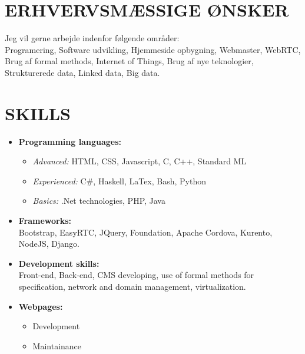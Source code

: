 \documentclass[11pt,a4paper,sans]{moderncv}        %
\begin{document}
\section{ERHVERVSMÆSSIGE ØNSKER}
Jeg vil gerne arbejde indenfor følgende områder:\\
Programering, Software udvikling, Hjemmeside opbygning, Webmaster, WebRTC, Brug af formal methods, Internet of Things, Brug af nye teknologier, Strukturerede data, Linked data, Big data.
\fi

\ifenglish
\section{SKILLS}
\begin{itemize}
\item \textbf{Programming languages:}
\begin{itemize}
\item \textit{Advanced:} HTML, CSS, Javascript, C, C++, Standard ML
\item \textit{Experienced:} C\#, Haskell, LaTex, Bash, Python
\item \textit{Basics:} .Net technologies, PHP, Java
\end{itemize}
\bigskip

\item \textbf{Frameworks:}\\
Bootstrap, EasyRTC, JQuery, Foundation, Apache Cordova, Kurento, NodeJS, Django.
\bigskip

\item \textbf{Development skills:}\\
Front-end, Back-end, CMS developing, use of formal methods for specification, network and domain management, virtualization.
\clearpage

\item \textbf{Webpages:}
\begin{itemize}
\item Development
\item Maintainance
\end{itemize}
\end{itemize}
\else
\end{document}
